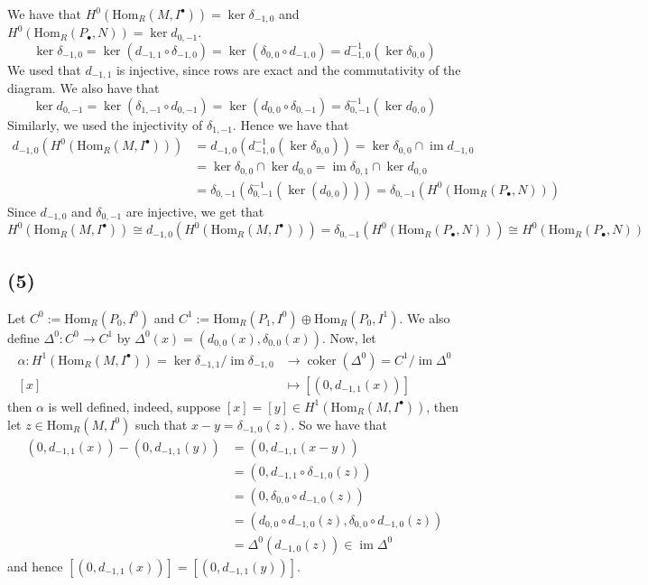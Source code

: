\documentclass{article}
\newcommand{\Hom}[2]{\mathrm{Hom}_R(#1, #2)}
\DeclareMathOperator{\im}{im}
\DeclareMathOperator{\coker}{coker}
\begin{document}
We have that $H^0(\Hom{M}{I^\bullet}) = \ker \delta_{-1, 0}$
and $H^0(\Hom{P_\bullet}{N}) = \ker d_{0, -1}$.
\begin{equation*}
	\ker \delta_{-1, 0} = \ker(d_{-1, 1}\circ \delta_{-1, 0})
	= \ker(\delta_{0, 0} \circ d_{-1, 0})
	= d_{-1, 0}^{-1}(\ker \delta_{0, 0})
\end{equation*}
We used that $d_{-1, 1}$ is injective, since rows are exact and
the commutativity of the diagram. We also have that
\begin{equation*}
	\ker d_{0, -1} = \ker(\delta_{1, -1}\circ d_{0, -1})
	= \ker(d_{0, 0} \circ \delta_{0, -1})
	= \delta_{0, -1}^{-1}(\ker d_{0, 0})
\end{equation*}
Similarly, we used the injectivity of $\delta_{1, -1}$.
Hence we have that
\begin{align*}
	d_{-1, 0}(H^0(\Hom{M}{I^\bullet}))
	&= d_{-1, 0}(d_{-1, 0}^{-1}(\ker \delta_{0, 0}))
	= \ker \delta_{0, 0} \cap \im d_{-1, 0}\\
	&= \ker{\delta_{0, 0}} \cap \ker d_{0, 0}
	= \im \delta_{0, 1} \cap \ker d_{0, 0}\\
	&= \delta_{0, -1}(\delta_{0, -1}^{-1}(\ker(d_{0, 0})))
	= \delta_{0, -1}(H^0(\Hom{P_\bullet}{N}))
\end{align*}
Since $d_{-1, 0}$ and $\delta_{0, -1}$ are injective, we get that
\begin{equation*}
	H^0(\Hom{M}{I^\bullet}) \cong
	d_{-1, 0}(H^0(\Hom{M}{I^\bullet}))
	= \delta_{0, -1}(H^0(\Hom{P_\bullet}{N}))
	\cong H^0(\Hom{P_\bullet}{N})
\end{equation*}

\subsection*{(5)}

Let $C^0 := \Hom{P_0}{I^0}$ and
$C^1 := \Hom{P_1}{I^0} \oplus \Hom{P_0}{I^1}$. We also define
$\Delta^0: C^0 \to C^1$ by 
$\Delta^0(x) = (d_{0, 0}(x), \delta_{0, 0}(x))$.
Now, let
\begin{align*}
	\alpha: H^1(\Hom{M}{I^\bullet}) =
	\ker \delta_{-1, 1}/\im \delta_{-1, 0} &\to \coker(\Delta^0)
	= C^1/\im \Delta^0\\
	[x] &\mapsto [(0, d_{-1, 1}(x))]
\end{align*}
then $\alpha$ is well defined, indeed, suppose 
$[x] = [y] \in H^1(\Hom{M}{I^\bullet})$, then
let $z \in \Hom{M}{I^0}$ such that $x - y = \delta_{-1, 0}(z)$.
So we have that
\begin{align*}
	(0, d_{-1, 1}(x)) - (0, d_{-1, 1}(y)) &= 
	(0, d_{-1, 1}(x - y))\\
	&= (0, d_{-1, 1}\circ\delta_{-1, 0}(z))\\
	&= (0, \delta_{0, 0}\circ d_{-1, 0}(z))\\
	&= (d_{0, 0}\circ d_{-1, 0}(z),
	\delta_{0, 0}\circ d_{-1, 0}(z))\\
	&= \Delta^0(d_{-1, 0}(z)) \in \im \Delta^0
\end{align*}
and hence $[(0, d_{-1, 1}(x))] = [(0, d_{-1, 1}(y))]$.
\end{document}
